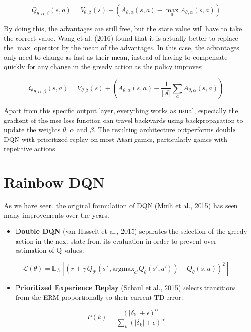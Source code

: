 \documentclass[
  letterpaper,
  DIV=11,
  numbers=noendperiod]{scrreprt}
\providecommand{\tightlist}{%
  \setlength{\itemsep}{0pt}\setlength{\parskip}{0pt}}\usepackage{longtable,booktabs,array}
\begin{document}
\[
    Q_{\theta, \alpha, \beta}(s, a) = V_{\theta, \beta}(s) + (A_{\theta, \alpha}(s, a) - \max_a A_{\theta, \alpha}(s, a))
\]

By doing this, the advantages are still free, but the state value will
have to take the correct value. Wang et al. (2016) found that it is
actually better to replace the \(\max\) operator by the mean of the
advantages. In this case, the advantages only need to change as fast as
their mean, instead of having to compensate quickly for any change in
the greedy action as the policy improves:

\[
    Q_{\theta, \alpha, \beta}(s, a) = V_{\theta, \beta}(s) + (A_{\theta, \alpha}(s, a) - \frac{1}{|\mathcal{A}|} \sum_a A_{\theta, \alpha}(s, a))
\]

Apart from this specific output layer, everything works as usual,
especially the gradient of the mse loss function can travel backwards
using backpropagation to update the weights \(\theta\), \(\alpha\) and
\(\beta\). The resulting architecture outperforms double DQN with
prioritized replay on most Atari games, particularly games with
repetitive actions.

\hypertarget{rainbow-dqn}{%
\section{Rainbow DQN}\label{rainbow-dqn}}

As we have seen. the original formulation of DQN (Mnih et al., 2015) has
seen many improvements over the years.

\begin{itemize}
\tightlist
\item
  \textbf{Double DQN} (van Hasselt et al., 2015) separates the selection
  of the greedy action in the next state from its evaluation in order to
  prevent over-estimation of Q-values:
\end{itemize}

\[\mathcal{L}(\theta) = \mathbb{E}_\mathcal{D} [(r + \gamma \, Q_{\theta'}(s´, \text{argmax}_{a'} Q_{\theta}(s', a')) - Q_\theta(s, a))^2]\]

\begin{itemize}
\tightlist
\item
  \textbf{Prioritized Experience Replay} (Schaul et al., 2015) selects
  transitions from the ERM proportionally to their current TD error:
\end{itemize}

\[P(k) = \frac{(|\delta_k| + \epsilon)^\alpha}{\sum_k (|\delta_k| + \epsilon)^\alpha}\]
\end{document}
